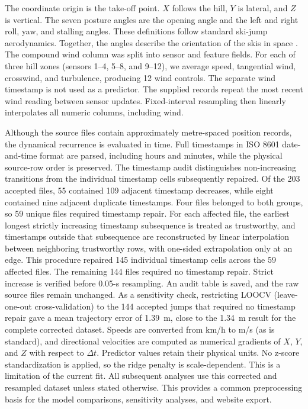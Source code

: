 \documentclass[11pt,twoside,a4paper]{article}
\begin{document}
The coordinate origin is the take-off point. $X$ follows the hill, $Y$ is lateral, and $Z$ is vertical. The seven posture angles are the opening angle and the left and right roll, yaw, and stalling angles. These definitions follow standard ski-jump aerodynamics. Together, the angles describe the orientation of the skis in space \cite{muller2008performance,virmavirta2019aerodynamics}. The compound wind column was split into sensor and feature fields. For each of three hill zones (sensors 1--4, 5--8, and 9--12), we average speed, tangential wind, crosswind, and turbulence, producing 12 wind controls. The separate wind timestamp is not used as a predictor. The supplied records repeat the most recent wind reading between sensor updates. Fixed-interval resampling then linearly interpolates all numeric columns, including wind. 

Although the source files contain approximately metre-spaced position records, the dynamical recurrence is evaluated in time. Full timestamps in ISO 8601 date-and-time format are parsed, including hours and minutes, while the physical source-row order is preserved. The timestamp audit distinguishes non-increasing transitions from the individual timestamp cells subsequently repaired. Of the 203 accepted files, 55 contained 109 adjacent timestamp decreases, while eight contained nine adjacent duplicate timestamps. Four files belonged to both groups, so 59 unique files required timestamp repair. For each affected file, the earliest longest strictly increasing timestamp subsequence is treated as trustworthy, and timestamps outside that subsequence are reconstructed by linear interpolation between neighboring trustworthy rows, with one-sided extrapolation only at an edge. This procedure repaired 145 individual timestamp cells across the 59 affected files. The remaining 144 files required no timestamp repair. Strict increase is verified before 0.05-s resampling. An audit table is saved, and the raw source files remain unchanged. As a sensitivity check, restricting LOOCV (leave-one-out cross-validation) to the 144 accepted jumps that required no timestamp repair gave a mean trajectory error of 1.39~m, close to the 1.34~m result for the complete corrected dataset. Speeds are converted from km/h to m/s (as is standard), and directional velocities are computed as numerical gradients of $X$, $Y$, and $Z$ with respect to $\Delta t$. Predictor values retain their physical units. No z-score standardization is applied, so the ridge penalty is scale-dependent. This is a limitation of the current fit. 
All subsequent analyses use this corrected and resampled dataset unless stated otherwise.
This provides a common preprocessing basis for the model comparisons, sensitivity analyses, and website export.
\end{document}
